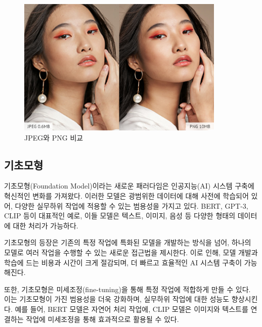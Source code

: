 \documentclass[
  letterpaper,
]{book}
\begin{document}
\begin{figure}

{\centering \includegraphics[width=3.90625in,height=\textheight]{images/jpeg-vs-png-file-size.jpg}

}

\caption{JPEG와 PNG 비교}

\end{figure}

{}

\hypertarget{uxae30uxcd08uxbaa8uxd615}{%
\subsection{기초모형}\label{uxae30uxcd08uxbaa8uxd615}}

기초모형(Foundation Model)이라는 새로운 패러다임은 인공지능(AI) 시스템
구축에 혁신적인 변화를 가져왔다. 이러한 모델은 광범위한 데이터에 대해
사전에 학습되어 있어, 다양한 실무하위 작업에 적용할 수 있는 범용성을
가지고 있다. BERT, GPT-3, CLIP 등이 대표적인 예로, 이들 모델은 텍스트,
이미지, 음성 등 다양한 형태의 데이터에 대한 처리가 가능하다.

기초모형의 등장은 기존의 특정 작업에 특화된 모델을 개발하는 방식을 넘어,
하나의 모델로 여러 작업을 수행할 수 있는 새로운 접근법을 제시한다. 이로
인해, 모델 개발과 학습에 드는 비용과 시간이 크게 절감되며, 더 빠르고
효율적인 AI 시스템 구축이 가능해진다.

또한, 기초모형은 미세조정(fine-tuning)을 통해 특정 작업에 적합하게 만들
수 있다. 이는 기초모형이 가진 범용성을 더욱 강화하며, 실무하위 작업에
대한 성능도 향상시킨다. 예를 들어, BERT 모델은 자연어 처리 작업에, CLIP
모델은 이미지와 텍스트를 연결하는 작업에 미세조정을 통해 효과적으로
활용될 수 있다.
\end{document}
